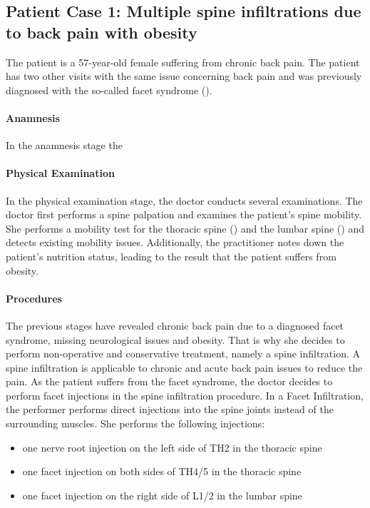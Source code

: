 \subsection{Patient Case 1: Multiple spine infiltrations due to back pain with obesity}\label{subsec:patient-a---multiple-spine-infiltrations-due-to-backpain-with-obesity}
The patient is a 57-year-old female suffering from chronic back pain.
The patient has two other visits with the same issue concerning back pain and was previously diagnosed with the so-called facet syndrome ().

\paragraph{Anamnesis}
In the anamnesis stage the

\paragraph{Physical Examination}
In the physical examination stage, the doctor conducts several examinations.
The doctor first performs a spine palpation and examines the patient's spine mobility.
She performs a mobility test for the thoracic spine () and the lumbar spine () and detects existing mobility issues.
Additionally, the practitioner notes down the patient's nutrition status, leading to the result that the patient suffers from obesity.

\paragraph{Procedures}
The previous stages have revealed chronic back pain due to a diagnosed facet syndrome, missing neurological issues and obesity.
That is why she decides to perform non-operative and conservative treatment, namely a spine infiltration.
A spine infiltration is applicable to chronic and acute back pain issues to reduce the pain.
As the patient suffers from the facet syndrome, the doctor decides to perform facet injections in the spine infiltration procedure.
In a Facet Infiltration, the performer performs direct injections into the spine joints instead of the surrounding muscles.
She performs the following injections:
\begin{itemize}
    \item one nerve root injection on the left side of TH2 in the thoracic spine
    \item one facet injection on both sides of TH4/5 in the thoracic spine
    \item one facet injection on the right side of L1/2 in the lumbar spine
\end{itemize}

